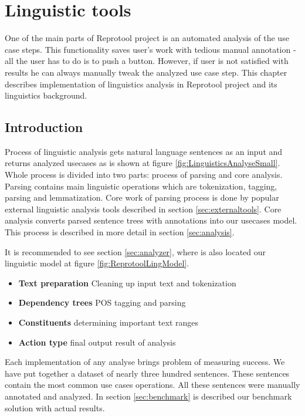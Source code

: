 \section{Linguistic tools}

One of the main parts of Reprotool project is an automated analysis of the use case steps. This functionality saves user's work with tedious manual annotation - all the user has to do is to push a button. However, if user is not satisfied with results he can always manually tweak the analyzed use case step. This chapter describes implementation of linguistics analysis in Reprotool project and its linguistics background.

\subsection{Introduction}
Process of linguistic analysis gets natural language sentences as an input and returns analyzed usecases as is shown at figure \ref{fig:LinguisticsAnalyseSmall}. Whole process is divided into two parts: process of parsing and core analysis. Parsing contains main linguistic operations which are tokenization, tagging, parsing and lemmatization. Core work of parsing process is done by popular external linguistic analysis tools described in section \ref{sec:externaltools}. Core analysis converts parsed sentence trees with annotations into our usecases model. This process is described in more detail in section \ref{sec:analysis}. 

It is recommended to see section \ref{sec:analyzer}, where is also located our linguistic model at figure \ref{fig:ReprotoolLingModel}.

\begin{itemize}
\item {\bf Text preparation} Cleaning up input text and tokenization
\item {\bf Dependency trees} POS tagging and parsing
\item {\bf Constituents} determining important text ranges
\item {\bf Action type} final output result of analysis
\end{itemize}

Each implementation of any analyse brings problem of measuring success. We have put together a dataset of nearly three hundred sentences. These sentences contain the most common use cases operations. All these sentences were manually annotated and analyzed. In section \ref{sec:benchmark} is described our benchmark solution with actual results.

